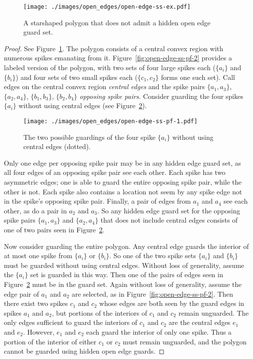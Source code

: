 \documentclass{cccg12}
\begin{document}
\begin{figure}[ht]
\centering
\texttt{[image: ./images/open\_edges/open-edge-ss-ex.pdf]}
\caption{A starshaped polygon that does not admit a hidden open edge guard set.}
\label{fig:open-edge-ss-ex}
\end{figure}

\begin{proof}

See Figure~\ref{fig:open-edge-ss-ex}.
The polygon consists of a central convex region with numerous spikes emanating from it.
Figure~\ref{fig:open-edge-ss-pf-2} provides a labeled version of the polygon, with two sets of four large spikes each ($\{a_i\}$ and $\{b_i\}$) and four sets of two small spikes each ($\{c_1, c_2\}$ forms one such set).
Call edges on the central convex region \emph{central edges} and the spike pairs $\{a_1, a_3\}$, $\{a_2, a_4\}$, $\{b_1, b_3\}$, $\{b_2, b_4\}$ \emph{opposing spike pairs}.
Consider guarding the four spikes $\{a_i\}$ without using central edges (see Figure~\ref{fig:open-edge-ss-pf-1}).

\begin{figure}[ht]
\centering
\texttt{[image: ./images/open\_edges/open-edge-ss-pf-1.pdf]}
\caption{The two possible guardings of the four spike $\{a_i\}$ without using central edges (dotted).}
\label{fig:open-edge-ss-pf-1}
\end{figure}

Only one edge per opposing spike pair may be in any hidden edge guard set, as all four edges of an opposing spike pair see each other.
Each spike has two asymmetric edges; one is able to guard the entire opposing spike pair, while the other is not.
Each spike also contains a location not seem by any spike edge not in the spike's opposing spike pair.
Finally, a pair of edges from $a_1$ and $a_4$ see each other, as do a pair in $a_2$ and $a_3$.
So any hidden edge guard set for the opposing spike pairs $\{a_1, a_3\}$ and $\{a_2, a_4\}$ that does not include central edges consists of one of two pairs seen in Figure~\ref{fig:open-edge-ss-pf-1}.

Now consider guarding the entire polygon.
Any central edge guards the interior of at most one spike from $\{a_i\}$ or $\{b_i\}$. 
So one of the two spike sets $\{a_i\}$ and $\{b_i\}$ must be guarded without using central edges.
Without loss of generality, assume the $\{a_i\}$ set is guarded in this way.
Then one of the pairs of edges seen in Figure~\ref{fig:open-edge-ss-pf-1} must be in the guard set.
Again without loss of generality, assume the edge pair of $a_1$ and $a_2$ are selected, as in Figure~\ref{fig:open-edge-ss-pf-2}.
Then there exist two spikes $c_1$ and $c_2$ whose edges are both seen by the guard edges in spikes $a_1$ and $a_2$, but portions of the interiors of $c_1$ and $c_2$ remain unguarded.
The only edges sufficient to guard the interiors of $c_1$ and $c_2$ are the central edges $e_1$ and $e_2$.
However, $e_1$ and $e_2$ each guard the interior of only one spike.
Thus a portion of the interior of either $c_1$ or $c_2$ must remain unguarded, and the polygon cannot be guarded using hidden open edge guards.


\end{proof}
\end{document}
